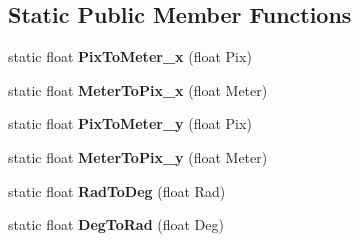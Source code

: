 \subsection*{Static Public Member Functions}
\begin{DoxyCompactItemize}
\item 
static float {\bfseries Pix\+To\+Meter\+\_\+x} (float Pix)\hypertarget{classGameItem_a58996071bc3039ae151f8a91024dcd17}{}\label{classGameItem_a58996071bc3039ae151f8a91024dcd17}

\item 
static float {\bfseries Meter\+To\+Pix\+\_\+x} (float Meter)\hypertarget{classGameItem_a4bc533807112f16030f646f32d587b7a}{}\label{classGameItem_a4bc533807112f16030f646f32d587b7a}

\item 
static float {\bfseries Pix\+To\+Meter\+\_\+y} (float Pix)\hypertarget{classGameItem_a5b2bcda53d0cebe338717347af7030cd}{}\label{classGameItem_a5b2bcda53d0cebe338717347af7030cd}

\item 
static float {\bfseries Meter\+To\+Pix\+\_\+y} (float Meter)\hypertarget{classGameItem_ac83bfc789dc61bf85cf0cce91a988116}{}\label{classGameItem_ac83bfc789dc61bf85cf0cce91a988116}

\item 
static float {\bfseries Rad\+To\+Deg} (float Rad)\hypertarget{classGameItem_a2d73b70119f56c82f53f92330fa99e0f}{}\label{classGameItem_a2d73b70119f56c82f53f92330fa99e0f}

\item 
static float {\bfseries Deg\+To\+Rad} (float Deg)\hypertarget{classGameItem_a229ae6c3829e1fa0fe25e172004042a3}{}\label{classGameItem_a229ae6c3829e1fa0fe25e172004042a3}

\end{DoxyCompactItemize}
